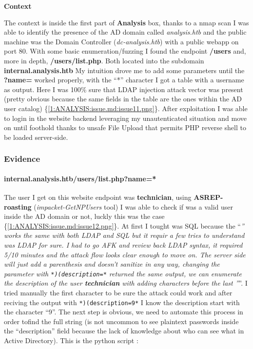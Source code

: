 \documentclass[a4paper]{article}
\newcommand{\passthrough}[1]{\colorbox{code}{\lstset{mathescape=false}#1}}
\begin{document}
\textbf{Context}

The context is inside the first part of \textbf{Analysis} box, thanks to a nmap scan I was able to identify the presence
of the AD domain called \emph{analysis.htb} and the public machine was the Domain Controller (\emph{dc-analysis.htb}) with a public webapp on port 80.
With some basic enumeration/fuzzing I found the endpoint \textbf{/users} and, more in depth, \textbf{/users/list.php}. Both located into the subdomain \textbf{internal.analysis.htb}
My intuition drove me to add some parameters until the \textbf{?name=} worked properly, with the ``*'' character I got a table with a username
as output. Here I was 100\% sure that LDAP injection attack vector was present (pretty obvious because the same fields in the table are the ones within the AD user catalog) \{\ref{1:ANALYSIS:issue.md:issue11.png}\}.
After exploitation I was able to login in the website backend leveraging my unautenticated situation and move on until foothold thanks to unsafe File Upload
that permits PHP reverse shell to be loaded server-side.


    \subsubsection{Evidence}

          \paragraph{internal.analysis.htb/users/list.php?name=*}

      The user I get on this website endpoint was \textbf{technician}, using \textbf{ASREP-roasting} (\emph{impacket-GetNPUsers} tool) I was able to check if was
a valid user inside the AD domain or not, luckly this was the case \{\ref{1:ANALYSIS:issue.md:issue12.png}\}. At first I tought was SQL because the ``\emph{'' works the same with both LDAP and SQL
but it requir a few tries to understand was LDAP for sure. I had to go AFK and review back LDAP syntax, it required 5/10 minutes and the attack flow
looks clear enough to move on. The server side will just add a parenthesis and doesn't sanitize in any way, changing the parameter with \passthrough{\lstinline!*)(description=*!}
returned the same output, we can enumerate the description of the user \textbf{technician} with adding characters before the last ''}''. I tried manually the first
character to be sure the attack could work and after reciving the output with \passthrough{\lstinline!*)(description=9*!} I know the description start with the character ``9''.
The next step is obvious, we need to automate this process in order tofind the full string (is not uncommon to see plaintext passwords inside the ``description'' field
because the lack of knowledge about who can see what in Active Directory). This is the python script :
\end{document}
